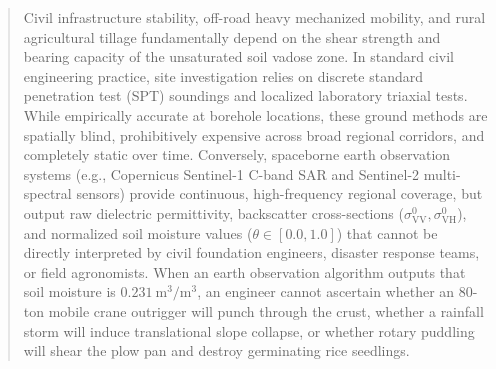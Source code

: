 \documentclass[11pt,a4paper]{article}
\theoremstyle{definition}
\theoremstyle{remark}
\begin{document}
\begin{abstract}
\noindent
Civil infrastructure stability, off-road heavy mechanized mobility, and rural agricultural tillage fundamentally depend on the shear strength and bearing capacity of the unsaturated soil vadose zone. In standard civil engineering practice, site investigation relies on discrete standard penetration test (SPT) soundings and localized laboratory triaxial tests. While empirically accurate at borehole locations, these ground methods are spatially blind, prohibitively expensive across broad regional corridors, and completely static over time. Conversely, spaceborne earth observation systems (e.g., Copernicus Sentinel-1 C-band SAR and Sentinel-2 multi-spectral sensors) provide continuous, high-frequency regional coverage, but output raw dielectric permittivity, backscatter cross-sections ($\sigma^0_{\text{VV}}, \sigma^0_{\text{VH}}$), and normalized soil moisture values ($\theta \in [0.0, 1.0]$) that cannot be directly interpreted by civil foundation engineers, disaster response teams, or field agronomists. When an earth observation algorithm outputs that soil moisture is $0.231~\text{m}^3/\text{m}^3$, an engineer cannot ascertain whether an 80-ton mobile crane outrigger will punch through the crust, whether a rainfall storm will induce translational slope collapse, or whether rotary puddling will shear the plow pan and destroy germinating rice seedlings.


\end{abstract}
\end{document}
